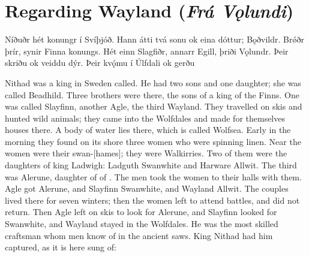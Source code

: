 \sectionline

\section{Regarding Wayland (\emph{Frá Vǫlundi})}

\bpg\bpa{}Níðuðr hét konungr í Svíþjóð.
Hann átti tvá sonu ok eina dóttur;  Bǫðvildr.
Brǿðr  þrír, synir Finna konungs.
Hét einn Slagfiðr, annarr Egill, þriði Vǫlundr.
Þeir skriðu ok veiddu dýr. Þeir kvǫ́mu í Úlfdali ok gerðu \epa

\bpb Nithad was a king in Sweden called.
He had two sons and one daughter; she was called Beadhild.
Three brothers were there, the sons of a king of the Finns.
One was called Slayfinn, another Agle, the third Wayland.
They travelled on skis and hunted wild animals; they came into the Wolfdales and made for themselves houses there.
A body of water lies there, which is called Wolfsea. Early in the morning they found on its shore three women who were spinning linen.
Near the women were their swan-[hames]; they were Walkirries.
Two of them were the daughters of king Ladwigh: Ladguth Swanwhite and Harware Allwit. The third was Alerune, daughter of  of .
The men took the women to their halls with them. Agle got Alerune, and Slayfinn Swanwhite, and Wayland Allwit.
The couples lived there for seven winters; then the women left to attend battles, and did not return.
Then Agle left on skis to look for Alerune, and Slayfinn looked for Swanwhite, and Wayland stayed in the Wolfdales.
He was the most skilled craftsman whom men know of in the ancient saws.
King Nithad had him captured, as it is here sung of:\epb\epg

